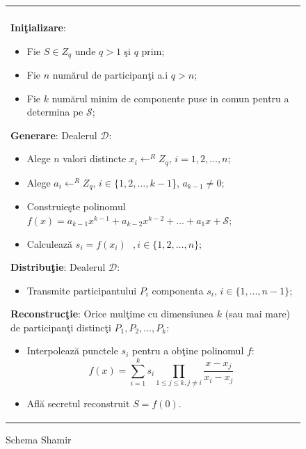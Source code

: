 \documentclass{llncs}
\begin{document}
\begin{figure}[h!]

\begin{tabular}{|p{\textwidth}|}
\hline

\\
\hspace{.1in}
\textbf{Ini\c{t}ializare}: 
	\begin{itemize}
		\item Fie $S \in Z_q$ unde $q > 1 $ \c{s}i $q$ prim;
		\item Fie $n$ num\u{a}rul de participan\c{t}i a.i $q > n$;
		\item Fie $k$ num\u{a}rul minim de componente puse in comun pentru a determina pe $\mathcal{S}$;
	\end{itemize}
\medskip

\hspace{.1in}
\textbf{Generare}: Dealerul $\mathcal{D}$:
	\begin{itemize}
		\item Alege $n$ valori distincte $x_i \leftarrow^R Z_q \text{, }i = 1,2,\dots,n$;
		\item Alege $a_{i} \leftarrow^R Z_q \text{, }i \in \{1,2,\dots,{k - 1}$\}, $a_{k-1} \neq 0$;
		\item Construie\c{s}te polinomul $f(x) = a_{k - 1}x ^ {k-1} + a_{k-2}x ^ {k - 2} + \dots + a_1x + \mathcal{S}$;
		\item Calculeaz\u{a} $s_i = f(x_i) \text{ }, i \in \{1,2,\dots,n\}$;
	\end{itemize}
\medskip

\hspace{.1in}
\textbf{Distribu\c{t}ie}: Dealerul $\mathcal{D}$:
	\begin{itemize}
		\item Transmite participantului $P_i$ componenta $s_i$, $i \in \{1,\dots,n-1\}$;
	\end{itemize}

\hspace{.1in}
\textbf{Reconstruc\c{t}ie}: Orice mul\c{t}ime cu dimensiunea $k$ (sau mai mare) de participan\c{t}i distinc\c{t}i $P_1, P_2, \dots, P_k$:
	\begin{itemize}
		\setlength{\itemsep}{5pt}
		\item Interpoleaz\u{a} punctele $s_i$ pentru a ob\c{t}ine polinomul $f$:
		\begin{equation} f(x)=\sum_{i=1}^{k} {s_i}\prod_{1 \leq j \leq k, j \neq i} \frac{x-x_j}{x_i-x_j} \end{equation}
		\item Afl\u{a} secretul reconstruit $S = f(0)$.
	\end{itemize}

\\
\hline
\end{tabular}

\caption{Schema Shamir \cite{S:1979}}
\label{fig:shamir_scheme}
\end{figure}
\end{document}
